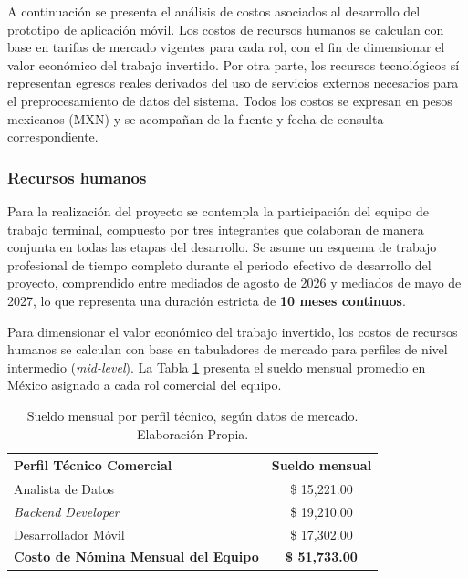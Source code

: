 A continuación se presenta el análisis de costos asociados al desarrollo del prototipo de aplicación móvil. Los costos de recursos humanos se calculan con base en tarifas de mercado vigentes para cada rol, con el fin de dimensionar el valor económico del trabajo invertido. Por otra parte, los recursos tecnológicos sí representan egresos reales derivados del uso de servicios externos necesarios para el preprocesamiento de datos del sistema. Todos los costos se expresan en pesos mexicanos (MXN) y se acompañan de la fuente y fecha de consulta correspondiente.


\subsubsection{Recursos humanos}

Para la realización del proyecto se contempla la participación del equipo de trabajo terminal, compuesto por tres integrantes que colaboran de manera conjunta en todas las etapas del desarrollo. Se asume un esquema de trabajo profesional de tiempo completo durante el periodo efectivo de desarrollo del proyecto, comprendido entre mediados de agosto de 2026 y mediados de mayo de 2027, lo que representa una duración estricta de \textbf{10 meses continuos}.

Para dimensionar el valor económico del trabajo invertido, los costos de recursos humanos se calculan con base en tabuladores de mercado para perfiles de nivel intermedio (\textit{mid-level}). La Tabla \ref{tab:sueldos_mercado} presenta el sueldo mensual promedio en México asignado a cada rol comercial del equipo.

\begin{table}[htbp]
    \centering
    \caption{Sueldo mensual por perfil técnico, según datos de mercado. Elaboración Propia.}
    \label{tab:sueldos_mercado}
    \begin{tabularx}{\textwidth}{|X|c|}
        \hline
        \textbf{Perfil Técnico Comercial} & \textbf{Sueldo mensual} \\ \hline
        Analista de Datos \cite{indeed_analistas_datos} & \$ 15,221.00 \\ \hline
        \textit{Backend Developer} \cite{indeed_backend_developer} & \$ 19,210.00 \\ \hline
        Desarrollador Móvil \cite{indeed_android_developer} & \$ 17,302.00 \\ \hline
        \multicolumn{1}{|r|}{\textbf{Costo de Nómina Mensual del Equipo}} & \textbf{\$ 51,733.00} \\ \hline
    \end{tabularx}
\end{table}

